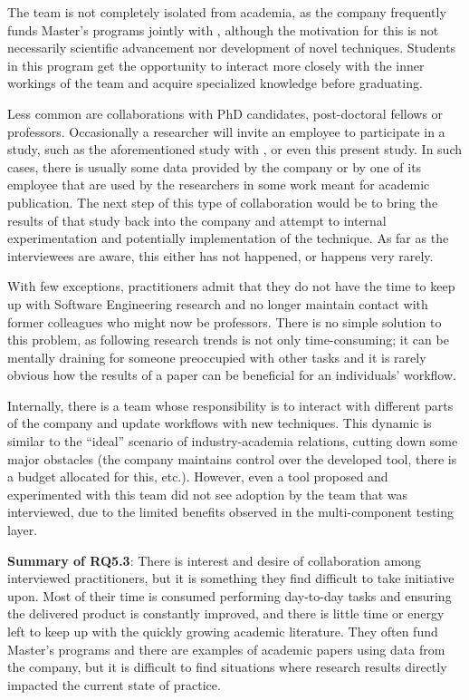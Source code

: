 The team is not completely isolated from academia, as the company frequently funds Master's programs jointly with , although the motivation for this is not necessarily scientific advancement nor development of novel techniques.
Students in this program get the opportunity to interact more closely with the inner workings of the team and acquire specialized knowledge before graduating.

Less common are collaborations with PhD candidates, post-doctoral fellows or professors.
Occasionally a researcher will invite an employee to participate in a study, such as the aforementioned study with , or even this present study.
In such cases, there is usually some data provided by the company or by one of its employee that are used by the researchers in some work meant for academic publication.
The next step of this type of collaboration would be to bring the results of that study back into the company and attempt to internal experimentation and potentially implementation of the technique.
As far as the interviewees are aware, this either has not happened, or happens very rarely.

With few exceptions, practitioners admit that they do not have the time to keep up with Software Engineering research and no longer maintain contact with former colleagues who might now be professors.
There is no simple solution to this problem, as following research trends is not only time-consuming; it can be mentally draining for someone preoccupied with other tasks and it is rarely obvious how the results of a paper can be beneficial for an individuals' workflow.

Internally, there is a team whose responsibility is to interact with different parts of the company and update workflows with new techniques.
This dynamic is similar to the ``ideal'' scenario of industry-academia relations, cutting down some major obstacles (the company maintains control over the developed tool, there is a budget allocated for this, etc.).
However, even a tool proposed and experimented with this team did not see adoption by the team that was interviewed, due to the limited benefits observed in the multi-component testing layer.

\begin{tcolorbox}%
\textbf{Summary of RQ5.3}: 
There is interest and desire of collaboration among interviewed practitioners, but it is something they find difficult to take initiative upon.
Most of their time is consumed performing day-to-day tasks and ensuring the delivered product is constantly improved, and there is little time or energy left to keep up with the quickly growing academic literature.
They often fund Master's programs and there are examples of academic papers using data from the company, but it is difficult to find situations where research results directly impacted the current state of practice.
\end{tcolorbox}
